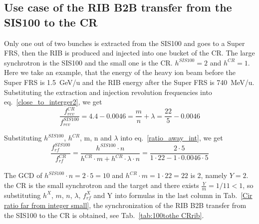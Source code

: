 \subsection{Use case of the RIB B2B transfer from the SIS100 to the CR} 
Only one out of two bunches is extracted from the SIS100 and goes to a Super FRS, then the RIB is produced and injected into one bucket of the CR. The large synchrotron is the SIS100 and the small one is the CR. $h^{\mathit{SIS100}}=2$ and $h^{\mathit{CR}}=1$. Here we take an example, that the energy of the heavy ion beam before the Super FRS is \SI{1.5}{GeV/\atomicmassunit} and the RIB energy after the Super FRS is \SI{740}{MeV/\atomicmassunit}. Substituting the extraction and injection revolution frequencies into eq.~\ref{close_to_interger2}, we get
\begin{equation} 
\frac{f_{\mathit{rev}}^{\mathit{CR}}}{f_{\mathit{rev}}^{\mathit{SIS100}}}=4.4-0.0046=\frac{m}{n}+ \lambda=\frac{22}{5}-0.0046
\end{equation}

Substituting $h^{\mathit{SIS100}}$, $h^{\mathit{CR}}$, m, n and $\lambda$ into eq.~\ref{ratio_away_int}, we get
\begin{equation} 
\frac{f_{\mathit{rf}}^{\mathit{SIS100}}}{f_{\mathit{rf}}^{\mathit{CR}}}=\frac{h^{\mathit{SIS100}}\cdot n}{h^{\mathit{CR}} \cdot m+ h^{\mathit{CR}} \cdot\lambda\cdot n}=\frac{2\cdot 5}{1 \cdot 22- 1 \cdot0.0046\cdot 5}
\end{equation}

The GCD of $h^{\mathit{SIS100}}\cdot n=2\cdot5=10$ and $h^{\mathit{CR}} \cdot m=1\cdot 22=22$ is 2, namely $Y=2$. the CR is the small synchrotron and the target and there exists $\frac{Y}{m}=1/11<1$, so substituting $h^X$, $m$, $n$, $\lambda$, $f_{\mathit{rf}}^{X}$ and Y into formulas in the last column in Tab.~\ref{Cir ratio far from integer small}, the synchronization of the RIB B2B transfer from the SIS100 to the CR is obtained, see Tab.~\ref{tab:100tothe CRrib}.

